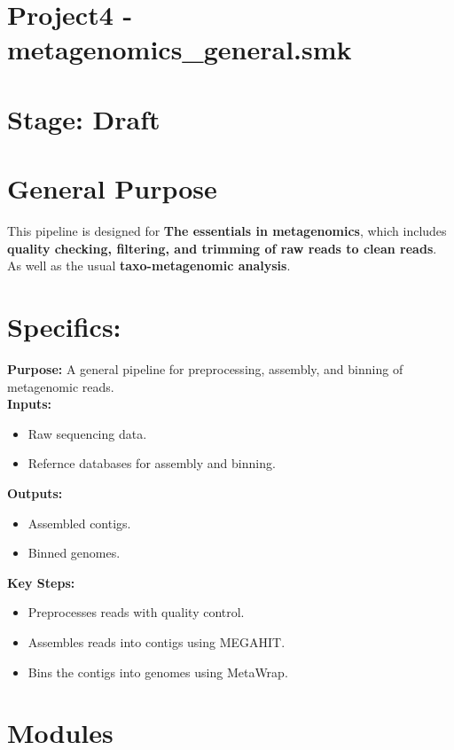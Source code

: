 \documentclass[11pt]{article}
\begin{document}
\newpage
\setcounter{section}{1}
\setcounter{subsection}{0}
\section*{Project4 - metagenomics\_general.smk}
\section*{Stage: Draft}   
\section*{General Purpose}

This pipeline is designed for \textbf{The essentials in metagenomics}, which includes \textbf{quality checking, filtering, and trimming of raw reads to clean reads}. As well as the usual \textbf{taxo-metagenomic analysis}. 

\section*{Specifics:}

\textbf{Purpose:} A general pipeline for preprocessing, assembly, and binning of metagenomic reads. \\
\textbf{Inputs:}
\begin{itemize}
	\item Raw sequencing data.
	\item Refernce databases for assembly and binning.
\end{itemize}
\textbf{Outputs:}
\begin{itemize}
	\item Assembled contigs.
	\item Binned genomes.
\end{itemize}
\textbf{Key Steps:}
\begin{itemize}
	\item Preprocesses reads with quality control.
	\item Assembles reads into contigs using MEGAHIT.
	\item Bins the contigs into genomes using MetaWrap.
\end{itemize}


\newpage
\section*{Modules}  %
\end{document}
